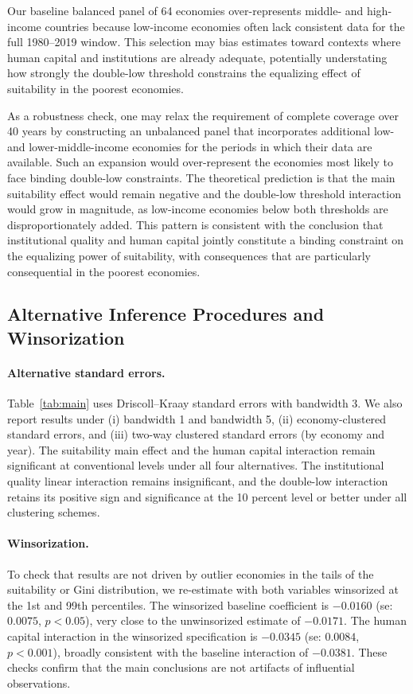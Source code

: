\documentclass[12pt]{article}
\begin{document}
Our baseline balanced panel of 64 economies
over-represents middle- and high-income countries
because low-income economies often lack consistent data
for the full 1980--2019 window.
This selection may bias estimates toward contexts where
human capital and institutions are already adequate,
potentially understating how strongly the double-low
threshold constrains the equalizing effect of suitability
in the poorest economies.

As a robustness check, one may relax the requirement of complete
coverage over 40 years by constructing an unbalanced panel that
incorporates additional low- and lower-middle-income economies
for the periods in which their data are available.
Such an expansion would over-represent the economies most likely
to face binding double-low constraints.
The theoretical prediction is that the main suitability effect
would remain negative and the double-low threshold interaction
would grow in magnitude, as low-income economies below both
thresholds are disproportionately added.
This pattern is consistent with the conclusion that institutional
quality and human capital jointly constitute a binding constraint
on the equalizing power of suitability, with consequences that
are particularly consequential in the poorest economies.

\subsection{Alternative Inference Procedures and Winsorization}
\label{sec:altinference}

\paragraph{Alternative standard errors.}
Table~\ref{tab:main} uses Driscoll--Kraay standard errors
with bandwidth 3.
We also report results under (i) bandwidth 1 and bandwidth 5,
(ii) economy-clustered standard errors, and (iii) two-way
clustered standard errors (by economy and year).
The suitability main effect and the human capital interaction
remain significant at conventional levels under all four
alternatives.
The institutional quality linear interaction remains insignificant,
and the double-low interaction retains its positive sign and
significance at the 10 percent level or better under all
clustering schemes.

\paragraph{Winsorization.}
To check that results are not driven by outlier economies in
the tails of the suitability or Gini distribution,
we re-estimate with both variables winsorized at the 1st and
99th percentiles.
The winsorized baseline coefficient is $-0.0160$ (se: $0.0075$,
$p < 0.05$), very close to the unwinsorized estimate of $-0.0171$.
The human capital interaction in the winsorized specification
is $-0.0345$ (se: $0.0084$, $p < 0.001$), broadly consistent with
the baseline interaction of $-0.0381$.
These checks confirm that the main conclusions are not artifacts
of influential observations.
\end{document}
